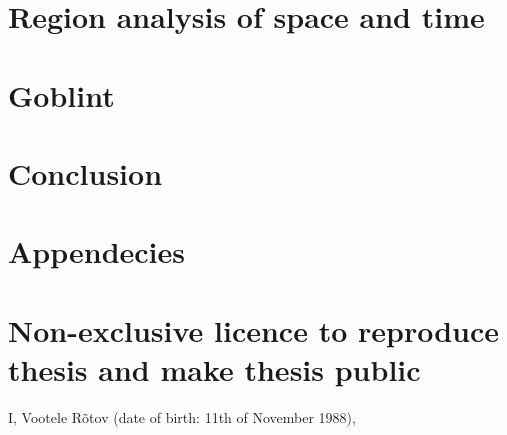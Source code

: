 \documentclass{style/master-thesis}
\begin{document}
\section{Region analysis of space and time}
\label{sec:region}


\pagebreak


\section{Goblint}
\label{sec:goblint}
%



\pagebreak


\clearpage
\section{Conclusion} 



\newpage

{}


\newpage

\appendix
\section*{Appendecies}
\renewcommand{\thesubsection}{\Alph{subsection}}

\pagebreak
\section*{\small Non-exclusive licence to reproduce thesis and make thesis public}


I, Vootele Rõtov (date of birth: 11th of November 1988),
\end{document}
